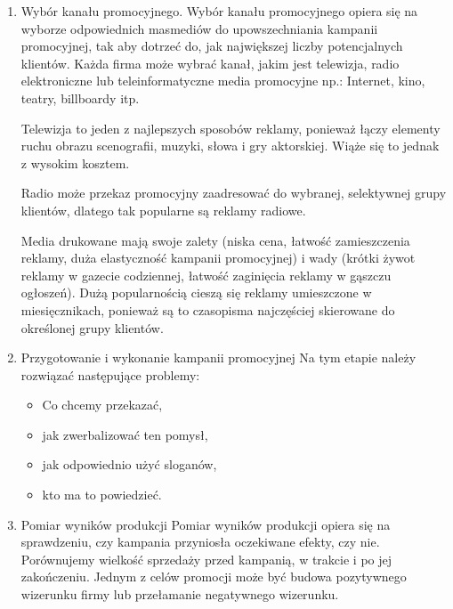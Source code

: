 \documentclass[a4paper, 12pt]{article}
\begin{document}
\begin{enumerate}
	\item Wybór kanału promocyjnego.
	\newline Wybór kanału promocyjnego opiera się na wyborze odpowiednich masmediów do upowszechniania kampanii promocyjnej, tak aby dotrzeć do, jak największej liczby potencjalnych klientów.
	Każda firma może wybrać kanał, jakim jest telewizja, radio elektroniczne lub teleinformatyczne media promocyjne np.: Internet, kino, teatry, billboardy itp.
	
	Telewizja to jeden z najlepszych sposobów reklamy, ponieważ łączy elementy ruchu obrazu scenografii, muzyki, słowa i gry aktorskiej. Wiąże się to jednak z wysokim kosztem.
	
	Radio może przekaz promocyjny zaadresować do wybranej, selektywnej grupy klientów, dlatego tak popularne są reklamy radiowe.
	
	Media drukowane mają swoje zalety (niska cena, łatwość zamieszczenia reklamy, duża elastyczność kampanii promocyjnej) i wady (krótki żywot reklamy w gazecie codziennej, łatwość zaginięcia reklamy w gąszczu ogłoszeń). Dużą popularnością cieszą się reklamy umieszczone w miesięcznikach, ponieważ są to czasopisma najczęściej skierowane do określonej grupy klientów.
	
	\item Przygotowanie i wykonanie kampanii promocyjnej
	\newline Na tym etapie należy rozwiązać następujące problemy:
	\begin{itemize}
		\item Co chcemy przekazać,
		\item jak zwerbalizować ten pomysł,
		\item jak odpowiednio użyć sloganów,
		\item kto ma to powiedzieć.
		
	\end{itemize}
	\item Pomiar wyników produkcji
	\newline Pomiar wyników produkcji opiera się na sprawdzeniu, czy kampania przyniosła oczekiwane efekty, czy nie. Porównujemy wielkość sprzedaży przed kampanią, w trakcie i po jej zakończeniu. Jednym z celów promocji może być budowa pozytywnego wizerunku firmy lub przełamanie negatywnego wizerunku.
		
\end{enumerate}
\end{document}
